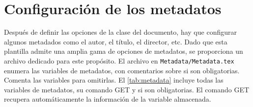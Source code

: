 \section{Configuración de los metadatos}
\label{sec:metadata}

Después de definir las opciones de la clase del documento, hay que configurar algunos metadados como el autor, el título, el director, etc. Dado que esta plantilla admite una amplia gama de opciones de metadatos, se proporciona un archivo dedicado para este propósito. El archivo en \texttt{Metadata/Metadata.tex} enumera las variables de metadatos, con comentarios sobre si son obligatorias. Comenta las variables para omitirlas. El \autoref{tab:metadata} incluye todas las variables de metadatos, su comando GET y si son obligatorias. El comando GET recupera automáticamente la información de la variable almacenada.

